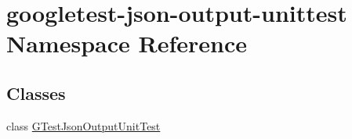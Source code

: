 \hypertarget{namespacegoogletest-json-output-unittest}{}\section{googletest-\/json-\/output-\/unittest Namespace Reference}
\label{namespacegoogletest-json-output-unittest}
\subsection*{Classes}
\begin{DoxyCompactItemize}
\item 
class \mbox{\hyperlink{classgoogletest-json-output-unittest_1_1GTestJsonOutputUnitTest}{G\+Test\+Json\+Output\+Unit\+Test}}
\end{DoxyCompactItemize}
